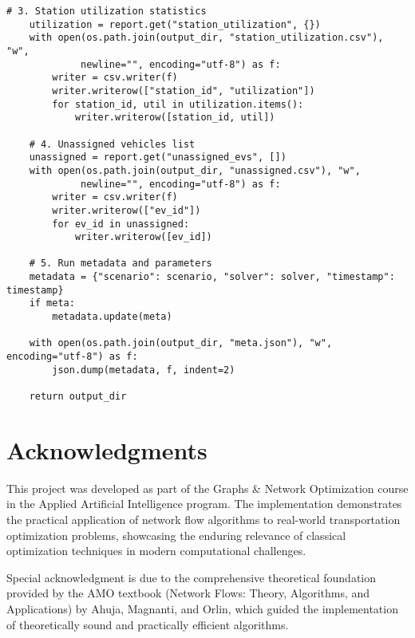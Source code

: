 \documentclass[12pt,a4paper]{article}
\begin{document}
\begin{lstlisting}[caption=Results Management System]
    # 3. Station utilization statistics
    utilization = report.get("station_utilization", {})
    with open(os.path.join(output_dir, "station_utilization.csv"), "w", 
             newline="", encoding="utf-8") as f:
        writer = csv.writer(f)
        writer.writerow(["station_id", "utilization"])
        for station_id, util in utilization.items():
            writer.writerow([station_id, util])
    
    # 4. Unassigned vehicles list
    unassigned = report.get("unassigned_evs", [])
    with open(os.path.join(output_dir, "unassigned.csv"), "w", 
             newline="", encoding="utf-8") as f:
        writer = csv.writer(f)
        writer.writerow(["ev_id"])
        for ev_id in unassigned:
            writer.writerow([ev_id])
    
    # 5. Run metadata and parameters
    metadata = {"scenario": scenario, "solver": solver, "timestamp": timestamp}
    if meta:
        metadata.update(meta)
    
    with open(os.path.join(output_dir, "meta.json"), "w", encoding="utf-8") as f:
        json.dump(metadata, f, indent=2)
    
    return output_dir
\end{lstlisting}

\section*{Acknowledgments}

This project was developed as part of the Graphs \& Network Optimization course in the Applied Artificial Intelligence program. The implementation demonstrates the practical application of network flow algorithms to real-world transportation optimization problems, showcasing the enduring relevance of classical optimization techniques in modern computational challenges.

Special acknowledgment is due to the comprehensive theoretical foundation provided by the AMO textbook (Network Flows: Theory, Algorithms, and Applications) by Ahuja, Magnanti, and Orlin, which guided the implementation of theoretically sound and practically efficient algorithms.
\end{document}
